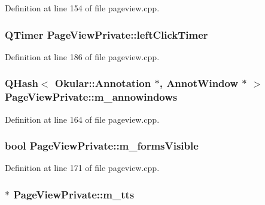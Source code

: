Definition at line 154 of file pageview.\+cpp.

\hypertarget{classPageViewPrivate_ac0d8482663a19cc6798a2c3b39f78d0e}{
\subsubsection[{left\+Click\+Timer}]{\setlength{\rightskip}{0pt plus 5cm}Q\+Timer Page\+View\+Private\+::left\+Click\+Timer}}\label{classPageViewPrivate_ac0d8482663a19cc6798a2c3b39f78d0e}


Definition at line 186 of file pageview.\+cpp.

\hypertarget{classPageViewPrivate_adb8fb9cfc6f045acbbe4cb534003adb2}{
\subsubsection[{m\+\_\+annowindows}]{\setlength{\rightskip}{0pt plus 5cm}Q\+Hash$<$ {\bf Okular\+::\+Annotation} $\ast$, {\bf Annot\+Window} $\ast$ $>$ Page\+View\+Private\+::m\+\_\+annowindows}}\label{classPageViewPrivate_adb8fb9cfc6f045acbbe4cb534003adb2}


Definition at line 164 of file pageview.\+cpp.

\hypertarget{classPageViewPrivate_ab9f225d7d34deb0a414ded10ab49a4dc}{
\subsubsection[{m\+\_\+forms\+Visible}]{\setlength{\rightskip}{0pt plus 5cm}bool Page\+View\+Private\+::m\+\_\+forms\+Visible}}\label{classPageViewPrivate_ab9f225d7d34deb0a414ded10ab49a4dc}


Definition at line 171 of file pageview.\+cpp.

\hypertarget{classPageViewPrivate_a85874d387cff75a0c9b07e698942483d}{
\subsubsection[{m\+\_\+tts}]{$\ast$ Page\+View\+Private\+::m\+\_\+tts}}\label{classPageViewPrivate_a85874d387cff75a0c9b07e698942483d}


